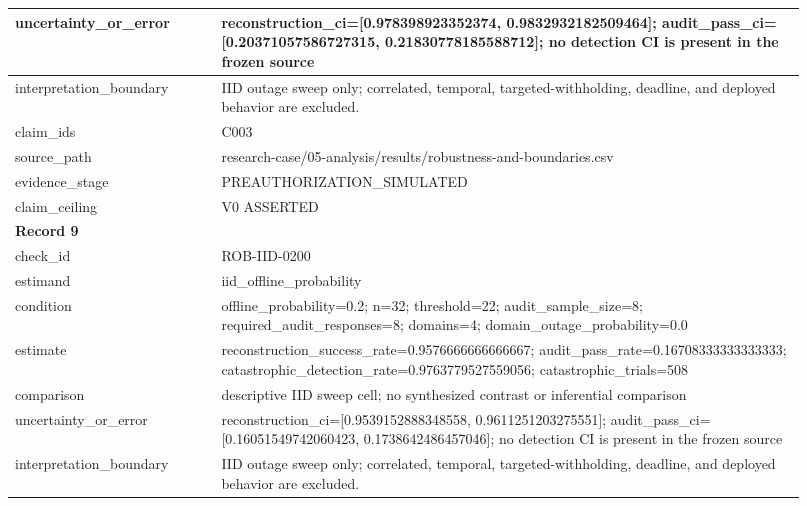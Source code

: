 \begin{longtable}{|p{0.24\linewidth}|p{0.68\linewidth}|}
uncertainty\_\allowbreak{}or\_\allowbreak{}error & reconstruction\_\allowbreak{}ci=[0.978398923352374, 0.9832932182509464];\allowbreak{} audit\_\allowbreak{}pass\_\allowbreak{}ci=[0.20371057586727315, 0.21830778185588712];\allowbreak{} no detection CI is present in the frozen source \\ \hline
interpretation\_\allowbreak{}boundary & IID outage sweep only;\allowbreak{} correlated, temporal, targeted-withholding, deadline, and deployed behavior are excluded. \\ \hline
claim\_\allowbreak{}ids & C003 \\ \hline
source\_\allowbreak{}path & research-case/05-analysis/results/robustness-and-boundaries.csv \\ \hline
evidence\_\allowbreak{}stage & PREAUTHORIZATION\_\allowbreak{}SIMULATED \\ \hline
claim\_\allowbreak{}ceiling & V0 ASSERTED \\ \hline
\multicolumn{2}{|l|}{\textbf{Record 9}} \\ \hline
check\_\allowbreak{}id & ROB-IID-0200 \\ \hline
estimand & iid\_\allowbreak{}offline\_\allowbreak{}probability \\ \hline
condition & offline\_\allowbreak{}probability=0.2;\allowbreak{} n=32;\allowbreak{} threshold=22;\allowbreak{} audit\_\allowbreak{}sample\_\allowbreak{}size=8;\allowbreak{} required\_\allowbreak{}audit\_\allowbreak{}responses=8;\allowbreak{} domains=4;\allowbreak{} domain\_\allowbreak{}outage\_\allowbreak{}probability=0.0 \\ \hline
estimate & reconstruction\_\allowbreak{}success\_\allowbreak{}rate=0.9576666666666667;\allowbreak{} audit\_\allowbreak{}pass\_\allowbreak{}rate=0.16708333333333333;\allowbreak{} catastrophic\_\allowbreak{}detection\_\allowbreak{}rate=0.9763779527559056;\allowbreak{} catastrophic\_\allowbreak{}trials=508 \\ \hline
comparison & descriptive IID sweep cell;\allowbreak{} no synthesized contrast or inferential comparison \\ \hline
uncertainty\_\allowbreak{}or\_\allowbreak{}error & reconstruction\_\allowbreak{}ci=[0.9539152888348558, 0.9611251203275551];\allowbreak{} audit\_\allowbreak{}pass\_\allowbreak{}ci=[0.16051549742060423, 0.1738642486457046];\allowbreak{} no detection CI is present in the frozen source \\ \hline
interpretation\_\allowbreak{}boundary & IID outage sweep only;\allowbreak{} correlated, temporal, targeted-withholding, deadline, and deployed behavior are excluded. \\ \hline

\end{longtable}
